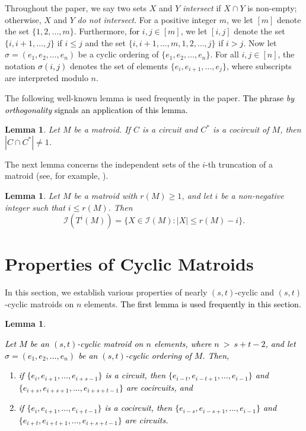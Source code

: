 \documentclass[11pt]{amsart}
\newtheorem{lemma}[theorem]{Lemma}
\newcommand{\bloo}{\textcolor{black}}
\begin{document}
Throughout the paper, we say two sets $X$ and $Y$ {\em intersect} if $X\cap Y$ is non-empty; otherwise, $X$ and $Y$ {\em do not intersect}. For a positive integer $m$, we let $[m]$ denote the set $\{1, 2, \ldots, m\}$. Furthermore, \bloo{for} $i, j\in [m]$, we let $[i, j]$ denote the set $\{i, i+1, \ldots, j\}$ if $i\le j$ and the set $\{i, i+1, \ldots, m, 1, 2, \ldots, j\}$ if \bloo{$i > j$}. Now let $\sigma=(e_1, e_2, \ldots, e_n)$ be a cyclic ordering of $\{e_1, e_2, \ldots, e_n\}$. For all $i, j\in [n]$, the notation \bloo{$\sigma(i, j)$} denotes the set of elements $\{e_i, e_{i+1}, \ldots, e_j\}$, where subscripts are interpreted modulo $n$.

The following well-known lemma is used frequently in the paper. \bloo{The phrase {\em by orthogonality} signals an application of this lemma.}

\begin{lemma}
Let $M$ be a matroid. If $C$ is a circuit and $C^*$ is a cocircuit of $M$, then $|C\cap C^*|\neq 1$.
\end{lemma}

The next lemma concerns the independent sets of the $i$-th truncation of a matroid (see, for example, \cite[Proposition~7.3.10]{ox11}).

\begin{lemma}
Let $M$ be a matroid with $r(M)\ge 1$, and let $i$ be a non-negative integer such that $i\le r(M)$. Then
$$\mathcal I(T^i(M))=\{X\in \mathcal I(M): |X|\le r(M)-i\}.$$
\label{truncation1}
\end{lemma}

\section{Properties of Cyclic Matroids}
\label{props}

In this section, we establish various properties of nearly $(s, t)$-cyclic and $(s, t)$-cyclic matroids on $n$ elements. \bloo{The first lemma is used frequently in this section.}

\begin{lemma}
\label{adj_cocircuits}
\bloo{Let $M$ be an $(s, t)$-cyclic matroid on $n$ elements, where $n~>~s+t-2$, and let $\sigma = (e_1,e_2,\ldots,e_n)$ be an $(s,t)$-cyclic ordering of $M$. Then,
\begin{enumerate}[{\rm (i)}]
	\item if $\{e_i,e_{i+1},\ldots,e_{i+s-1}\}$ is a circuit, then $\{e_{i-t},e_{i-t+1},\ldots,e_{i-1}\}$ and $\{e_{i+s},e_{i+s+1},\ldots,e_{i+s+t-1}\}$ are cocircuits, and
	\item if $\{e_i,e_{i+1},\ldots,e_{i+t-1}\}$ is a cocircuit, then $\{e_{i-s},e_{i-s+1},\ldots,e_{i-1}\}$ and $\{e_{i+t},e_{i+t+1},\ldots,e_{i+s+t-1}\}$ are circuits.
\end{enumerate}}
\end{lemma}
\end{document}
